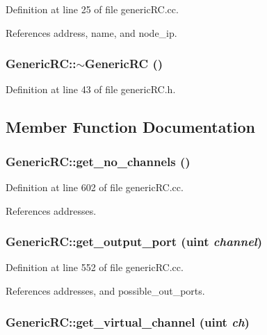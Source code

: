 Definition at line 25 of file genericRC.cc.

References address, name, and node\_\-ip.
\subsubsection[{$\sim$GenericRC}]{\setlength{\rightskip}{0pt plus 5cm}GenericRC::$\sim$GenericRC ()\hspace{0.3cm}{\tt  [inline]}}\label{classGenericRC_f63422fabc3b4393e060ea7ad68981e9}




Definition at line 43 of file genericRC.h.

\subsection{Member Function Documentation}
\subsubsection[{get\_\-no\_\-channels}]{ GenericRC::get\_\-no\_\-channels ()}\label{classGenericRC_6d8e1133e7eefd95a25a4dfe7d45491e}




Definition at line 602 of file genericRC.cc.

References addresses.
\subsubsection[{get\_\-output\_\-port}]{ GenericRC::get\_\-output\_\-port ({\bf uint} {\em channel})}\label{classGenericRC_e7923344b8690a7836dfbe144569e680}




Definition at line 552 of file genericRC.cc.

References addresses, and possible\_\-out\_\-ports.
\subsubsection[{get\_\-virtual\_\-channel}]{ GenericRC::get\_\-virtual\_\-channel ({\bf uint} {\em ch})}\label{classGenericRC_3970953702fc5f6d491c21cf3b3d27e3}




